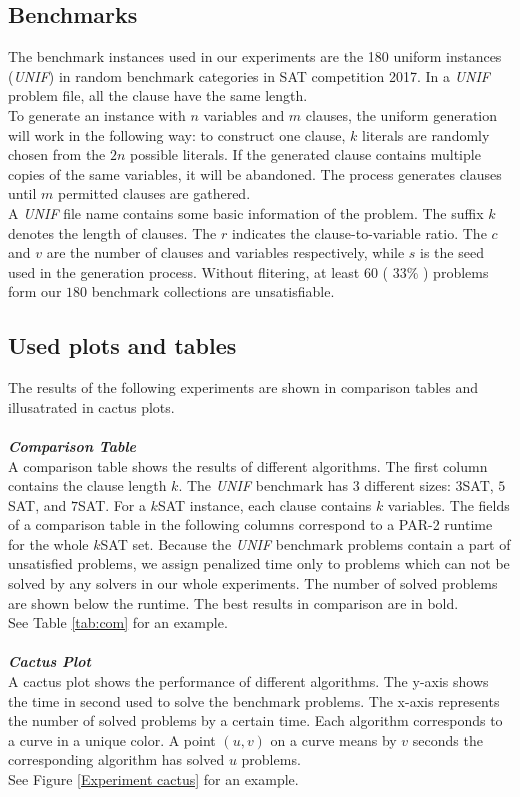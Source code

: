 \documentclass[12pt,a4paper,twoside]{scrartcl}
\numberwithin{equation}{section}
\begin{document}
\subsection{Benchmarks}
\label{benchmark}
The benchmark instances used in our experiments are the 180 uniform instances (\emph{UNIF}) in random benchmark categories in SAT competition 2017\cite{balyo2017proceedings}. In a \emph{UNIF} problem file, all the clause have the same length.\\
To generate an instance with $n$ variables and $m$ clauses, the uniform generation will work in the following way: to construct one clause, $k$ literals are randomly chosen from the $2n$ possible literals. If the generated clause contains multiple copies of the same variables, it will be abandoned. The process generates clauses until $m$ permitted clauses are gathered.\\
A \emph{UNIF} file name contains some basic information of the problem. The suffix $k$  denotes the length of clauses. The $r$ indicates the clause-to-variable ratio. The $c$ and $v$ are the number of clauses and variables respectively, while $s$ is the seed used in the generation process.
Without flitering, at least $60$ ( $33\%$ ) problems form our $180$ benchmark collections are unsatisfiable.
\clearpage
\subsection{Used plots and tables}
The results of the following experiments are shown in comparison tables and  illusatrated in cactus plots.  \\
\\
\emph{\textbf{Comparison Table}}\\
A comparison table shows the results of different algorithms. The first column contains the
clause length $k$. The  \emph{UNIF} benchmark has $3$ different sizes: $3$SAT, $5$SAT, and $7$SAT. For a $k$SAT instance, each clause contains $k$ variables. The fields of a comparison table in the following columns correspond to a PAR-2 runtime for the whole $k$SAT set\cite{balyo2017proceedings}. Because the  \emph{UNIF} benchmark problems contain a part of unsatisfied problems, we assign penalized time only to problems which can not be solved by any solvers in our whole experiments. The number of solved problems are shown below the runtime. The best results in comparison are in bold.
\\
See Table \ref{tab:com} for an example.\\
\\
\emph{\textbf{Cactus Plot}}\\
A cactus plot shows the performance of different algorithms. The y-axis shows the time in second used to solve the benchmark problems.  The x-axis represents the number of solved problems by a certain time. Each algorithm corresponds to a curve in a unique color. A point $(u, v)$ on a curve means by $v$ seconds the corresponding algorithm has solved  $u$ problems.  \\
See Figure \ref{Experiment cactus} for an example.\\
\end{document}
